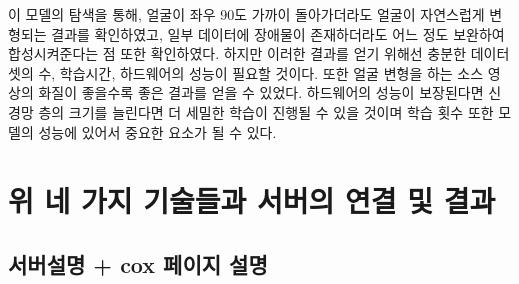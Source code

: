\documentclass{oblivoir}
\begin{document}
    이 모델의 탐색을 통해, 얼굴이 좌우 90도 가까이 돌아가더라도 얼굴이 자연스럽게 변형되는 결과를 확인하였고, 일부 데이터에 장애물이 존재하더라도 어느 정도 보완하여 합성시켜준다는 점 또한 확인하였다. 하지만 이러한 결과를 얻기 위해선 충분한 데이터 셋의 수, 학습시간, 하드웨어의 성능이 필요할 것이다. 또한 얼굴 변형을 하는 소스 영상의 화질이 좋을수록 좋은 결과를 얻을 수 있었다. 하드웨어의 성능이 보장된다면 신경망 층의 크기를 늘린다면 더 세밀한 학습이 진행될 수 있을 것이며 학습 횟수 또한 모델의 성능에 있어서 중요한 요소가 될 수 있다.

\chapter{ 위 네 가지 기술들과 서버의 연결 및 결과  }

\section{ 서버설명 + cox 페이지 설명}

\newpage
\end{document}
